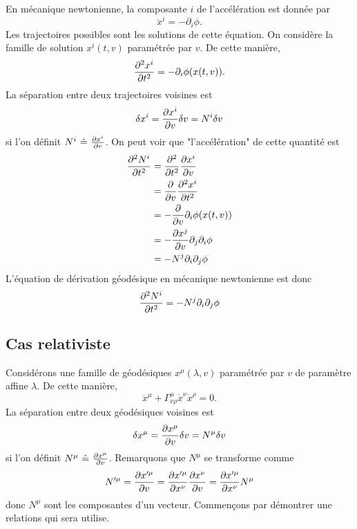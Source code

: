 \documentclass[a4paper,11pt]{report}
\theoremstyle{definition}
\theoremstyle{plain}
\theoremstyle{definition}
\theoremstyle{remark}
\newcommand{\p}{\partial}
\begin{document}
            En mécanique newtonienne, la composante $i$ de l'accélération est donnée par
            \begin{equation}
                \ddot{x}^i = -\p_i\phi.
            \end{equation}
            Les trajectoires possibles sont les solutions de cette équation. On considère la famille de solution $x^i(t,v)$ paramétrée par $v$. De cette manière,
            \begin{equation}
                \pdv[2]{x^i}{t} = -\p_i\phi(x(t,v)).
            \end{equation}
            La séparation entre deux trajectoires voisines est
            \begin{equation}
                \delta x^i = \pdv{x^i}{v}\delta v = N^i \delta v
            \end{equation}
            si l'on définit $N^i~\hat{=}~\pdv{x^i}{v}$. On peut voir que "l'accélération" de cette quantité est
            \begin{align}
                \pdv[2]{N^i}{t} &= \pdv[2]{}{t}\pdv{x^i}{v}\\
                &= \pdv{}{v}\pdv[2]{x^i}{t}\\
                &= -\pdv{}{v}\p_i\phi(x(t,v))\\
                &= -\pdv{x^j}{v}\p_j\p_i\phi\\
                &= -N^j\p_i\p_j\phi
            \end{align}
            L'équation de dérivation géodésique en mécanique newtonienne est donc
            \begin{equation}
                \pdv[2]{N^i}{t} = -N^j\p_i\p_j\phi
            \end{equation}
            
        \subsection{Cas relativiste}
        
            Considérons une famille de géodésiques $x^\mu(\lambda,v)$ paramétrée par $v$ de paramètre affine $\lambda$. De cette manière,
            \begin{equation}
                \ddot{x}^\mu + \Gamma^\mu_{\nu\rho}\dot{x}^\nu\dot{x}^\rho = 0.
            \end{equation}
            La séparation entre deux géodésiques voisines est
            \begin{equation}
                \delta x^\mu = \pdv{x^\mu}{v}\delta v = N^\mu \delta v
            \end{equation}
            si l'on définit $N^\mu~\hat{=}~\pdv{x^\mu}{v}$. Remarquons que $N^\mu$ se transforme comme
            \begin{equation}
                N'^\mu = \pdv{x'^\mu}{v} = \pdv{x'^\mu}{x^\nu}\pdv{x^\nu}{v} = \pdv{x'^\mu}{x^\nu}N^\mu
            \end{equation}
            donc $N^\mu$ sont les composantes d'un vecteur. Commençons par démontrer une relations qui sera utilise.
        
\end{document}
